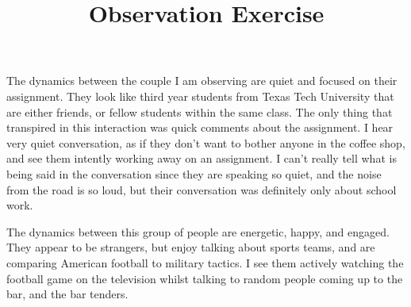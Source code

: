 \documentclass[12pt]{article}
\begin{document}
\title{Observation Exercise}




\par
The dynamics between the couple I am observing are quiet and focused on their assignment. They look like third year students from Texas Tech University that are either friends, or fellow students within the same class. The only thing that transpired in this interaction was quick comments about the assignment. I hear very quiet conversation, as if they don't want to bother anyone in the coffee shop, and see them intently working away on an assignment. I can't really tell what is being said in the conversation since they are speaking so quiet, and the noise from the road is so loud, but their conversation was definitely only about school work.

\par
The dynamics between this group of people are energetic, happy, and engaged. They appear to be strangers, but enjoy talking about sports teams, and are comparing American football to military tactics. I see them actively watching the football game on the television whilst talking to random people coming up to the bar, and the bar tenders.
\par

\par

\par
\end{document}
